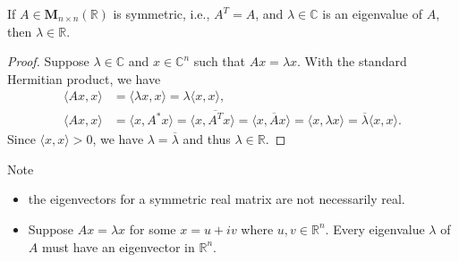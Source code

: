 \documentclass{ctexart}
\newcommand{\M}{\mathbf{M}}
\newcommand{\R}{\mathbb{R}}
\newcommand{\C}{\mathbb{C}}
\begin{document}
    \begin{mythm}\label{thm: eigenvalue of symmetric matrix is real}
        If $A\in \M_{n\times n}(\R)$ is symmetric, i.e., $A^T = A$, and $\lambda \in \C$ is an eigenvalue of $A$, then $\lambda \in \R$.
    \end{mythm}
    \begin{proof}
        Suppose $\lambda \in \C$ and $x\in \C ^n$ such that $A x = \lambda x$. With the standard Hermitian product, we have
        \[
        \begin{aligned}
            \langle A x, x \rangle &= \langle \lambda x, x \rangle = \lambda \langle x, x \rangle,\\
            \langle A x, x \rangle &= \langle x, A^* x \rangle = \langle x, \overline{A^T} x \rangle = \langle x, \overline{A} x \rangle=  \langle x, \lambda x \rangle = \overline{\lambda} \langle x, x \rangle.
        \end{aligned}
        \]
        Since $\langle x, x \rangle > 0$, we have $\lambda = \overline{\lambda}$ and thus $\lambda \in \R$.
    \end{proof}
    \begin{myrmk}
        Note
        \begin{itemize}
            \item the eigenvectors for a symmetric real matrix are not necessarily real.
            \item Suppose $Ax = \lambda x$ for some $x=u+iv$ where $u,v\in \R^n$. Every eigenvalue $\lambda$ of $A$ must have an eigenvector in $\R^n$.
        \end{itemize}
    \end{myrmk}
\end{document}
